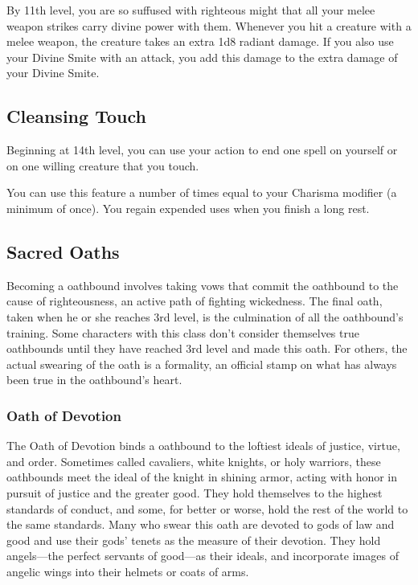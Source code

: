 By 11th level, you are so suffused with righteous might that all your melee weapon strikes carry divine power with them. Whenever you hit a creature with a melee weapon, the creature takes an extra 1d8 radiant damage. If you also use your Divine Smite with an attack, you add this damage to the extra damage of your Divine Smite.

\subsection{Cleansing Touch}

Beginning at 14th level, you can use your action to end one spell on yourself or on one willing creature that you touch.

You can use this feature a number of times equal to your Charisma modifier (a minimum of once). You regain expended uses when you finish a long rest.

\subsection{Sacred Oaths}

Becoming a oathbound involves taking vows that commit the oathbound to the cause of righteousness, an active path of fighting wickedness. The final oath, taken when he or she reaches 3rd level, is the culmination of all the oathbound's training. Some characters with this class don't consider themselves true oathbounds until they have reached 3rd level and made this oath. For others, the actual swearing of the oath is a formality, an official stamp on what has always been true in the oathbound's heart.

\subsubsection{Oath of Devotion}

The Oath of Devotion binds a oathbound to the loftiest ideals of justice, virtue, and order. Sometimes called cavaliers, white knights, or holy warriors, these oathbounds meet the ideal of the knight in shining armor, acting with honor in pursuit of justice and the greater good. They hold themselves to the highest standards of conduct, and some, for better or worse, hold the rest of the world to the same standards. Many who swear this oath are devoted to gods of law and good and use their gods' tenets as the measure of their devotion. They hold angels—the perfect servants of good—as their ideals, and incorporate images of angelic wings into their helmets or coats of arms.

